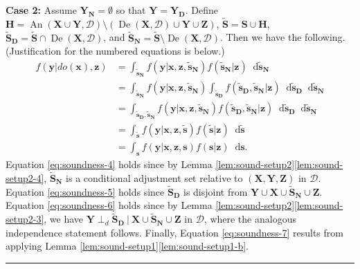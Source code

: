 \documentclass[twoside]{article}
\DeclareMathOperator{\An}{An}
\DeclareMathOperator{\De}{De}
\newcommand\given[1][]{\:#1\vert\:}
\newcommand{\mb}[1]{\mathbf{#1}}
\newcommand{\dsepp}{\perp_{d}}
\newcommand{\g}[1][G]{\mathcal{#1}}
\newcommand*\diff{\mathop{}\!\mathrm{d}}
\newenvironment{proofof}[1][]{\begin{trivlist}
\item[\hskip \labelsep {\bfseries Proof of #1.}]}{\hfill\BlackBox\end{trivlist}}
\newcommand{\BlackBox}{\rule{1.5ex}{1.5ex}}
\begin{document}
\begin{proofof}[Theorem \ref{thm:soundness}]

    \textbf{Case 2:} Assume $\mb{Y_N} = \emptyset$ so that $\mb{Y} = \mb{Y_D}$. Define $\mb{H} = \An(\mb{X} \cup \mb{Y},\g[D]) \setminus (\De(\mb{X}, \g[D]) \cup \mb{Y} \cup \mb{Z})$, $\mb{\tilde{S}} = \mb{S} \cup \mb{H}$, $\mb{\tilde{S}_D} = \mb{\tilde{S}} \cap \De(\mb{X}, \g[D])$, and $\mb{\tilde{S}_N} = \mb{\tilde{S}} \setminus \De(\mb{X}, \g[D])$. Then we have the following. (Justification for the numbered equations is below.)
    \begin{align}
        f(\mb{y} | do(\mb{x}), \mb{z})
            &= \int_{\mb{\tilde{s}_N}} f(\mb{y} | \mb{x,z,\tilde{s}_N}) f(\mb{\tilde{s}_N} | \mb{z}) \diff \mb{\tilde{s}_N} \label{eq:soundness-4} \\
            &= \int_{\mb{\tilde{s}_N}} f(\mb{y} | \mb{x,z,\tilde{s}_N}) \int_{\mb{\tilde{s}_D}} f(\mb{\tilde{s}_D,\tilde{s}_N} | \mb{z}) \diff \mb{\tilde{s}_D} \diff \mb{\tilde{s}_N} \nonumber \\
            &= \int_{\mb{\tilde{s}_D,\tilde{s}_N}} f(\mb{y} | \mb{x,z,\tilde{s}_N}) f(\mb{\tilde{s}_D,\tilde{s}_N} | \mb{z}) \diff \mb{\tilde{s}_D} \diff \mb{\tilde{s}_N} \label{eq:soundness-5} \\
            &= \int_{\mb{\tilde{s}}} f(\mb{y} | \mb{x,z,\tilde{s}}) f(\mb{\tilde{s}} | \mb{z}) \diff \mb{\tilde{s}} \label{eq:soundness-6} \\
            &= \int_{\mb{s}} f(\mb{y} | \mb{x,z,s}) f(\mb{s} | \mb{z}) \diff \mb{s}. \label{eq:soundness-7}
    \end{align}
    Equation \eqref{eq:soundness-4} holds since by Lemma \ref{lem:sound-setup2}\ref{lem:sound-setup2-4}, $\mb{\tilde{S}_N}$ is a conditional adjustment set relative to $(\mb{X,Y,Z})$ in $\g[D]$. Equation \eqref{eq:soundness-5} holds since $\mb{\tilde{S}_D}$ is disjoint from $\mb{Y} \cup \mb{X} \cup \mb{\tilde{S}_N} \cup \mb{Z}$. Equation \eqref{eq:soundness-6} holds since by Lemma \ref{lem:sound-setup2}\ref{lem:sound-setup2-3}, we have $\mb{Y} \dsepp \mb{\tilde{S}_D} \given \mb{X} \cup \mb{\tilde{S}_N} \cup \mb{Z}$ in $\g[D]$, where the analogous independence statement follows. Finally, Equation \eqref{eq:soundness-7} results from applying Lemma \ref{lem:sound-setup1}\ref{lem:sound-setup1-b}.



\end{proofof}
\end{document}
